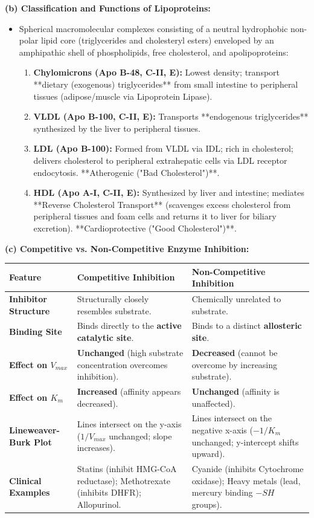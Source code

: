 \documentclass[11pt,a4paper]{article}
\begin{document}
\begin{ansbox}
\textbf{(b) Classification and Functions of Lipoproteins:}
\begin{itemize}[leftmargin=*]
    \item Spherical macromolecular complexes consisting of a neutral hydrophobic non-polar lipid core (triglycerides and cholesteryl esters) enveloped by an amphipathic shell of phospholipids, free cholesterol, and apolipoproteins:
    \begin{enumerate}
        \item \textbf{Chylomicrons (Apo B-48, C-II, E):} Lowest density; transport **dietary (exogenous) triglycerides** from small intestine to peripheral tissues (adipose/muscle via Lipoprotein Lipase).
        \item \textbf{VLDL (Apo B-100, C-II, E):} Transports **endogenous triglycerides** synthesized by the liver to peripheral tissues.
        \item \textbf{LDL (Apo B-100):} Formed from VLDL via IDL; rich in cholesterol; delivers cholesterol to peripheral extrahepatic cells via LDL receptor endocytosis. **Atherogenic ("Bad Cholesterol")**.
        \item \textbf{HDL (Apo A-I, C-II, E):} Synthesized by liver and intestine; mediates **Reverse Cholesterol Transport** (scavenges excess cholesterol from peripheral tissues and foam cells and returns it to liver for biliary excretion). **Cardioprotective ("Good Cholesterol")**.
    \end{enumerate}
\end{itemize}

\textbf{(c) Competitive vs. Non-Competitive Enzyme Inhibition:}
\begin{center}
\begin{tabularx}{\textwidth}{p{3.2cm}X X}
\toprule
\textbf{Feature} & \textbf{Competitive Inhibition} & \textbf{Non-Competitive Inhibition} \\
\midrule
\textbf{Inhibitor Structure} & Structurally closely resembles substrate. & Chemically unrelated to substrate. \\
\textbf{Binding Site} & Binds directly to the \textbf{active catalytic site}. & Binds to a distinct \textbf{allosteric site}. \\
\textbf{Effect on $V_{max}$} & \textbf{Unchanged} (high substrate concentration overcomes inhibition). & \textbf{Decreased} (cannot be overcome by increasing substrate). \\
\textbf{Effect on $K_m$} & \textbf{Increased} (affinity appears decreased). & \textbf{Unchanged} (affinity is unaffected). \\
\textbf{Lineweaver-Burk Plot} & Lines intersect on the y-axis ($1/V_{max}$ unchanged; slope increases). & Lines intersect on the negative x-axis ($-1/K_m$ unchanged; y-intercept shifts upward). \\
\textbf{Clinical Examples} & Statins (inhibit HMG-CoA reductase); Methotrexate (inhibits DHFR); Allopurinol. & Cyanide (inhibits Cytochrome oxidase); Heavy metals (lead, mercury binding $-SH$ groups). \\
\bottomrule
\end{tabularx}
\end{center}
\end{ansbox}
\end{document}
